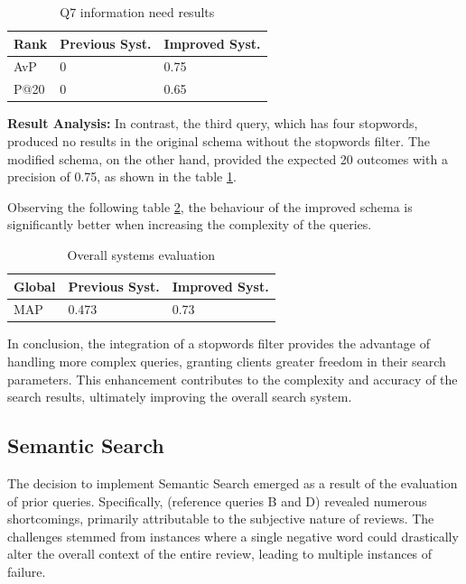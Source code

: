\documentclass[sigconf]{acmart}
\begin{document}
\begin{table}[H]
\caption{Q7 information need results}
\label{tab:q7}
\begin{tabular}{lll}
\toprule
Rank & Previous Syst. & Improved Syst.\\
\midrule
AvP & 0 & 0.75  \\
P@20 & 0 & 0.65 \\
\bottomrule
\end{tabular}
\end{table}

\textbf{Result Analysis:} In contrast, the third query, which has four stopwords, produced no results in the original schema without the stopwords filter. The modified schema, on the other hand, provided the expected 20 outcomes with a precision of 0.75, as shown in the table \ref{tab:q7}.

Observing the following table \ref{tab:map_stopwords}, the behaviour of the improved schema is significantly better when increasing the complexity of the queries.

\begin{table}[H]
\caption{Overall systems evaluation}
\label{tab:map_stopwords}
\begin{tabular}{lll}
\toprule
Global & Previous Syst. & Improved Syst.\\
\midrule
MAP & 0.473 & 0.73  \\

\bottomrule
\end{tabular}
\end{table}

In conclusion, the integration of a stopwords filter provides the advantage of handling more complex queries, granting clients greater freedom in their search parameters. This enhancement contributes to the complexity and accuracy of the search results, ultimately improving the overall search system.


\renewcommand{\thesubsection}{\arabic{section}.2}
\subsection{Semantic Search}

The decision to implement Semantic Search emerged as a result of the evaluation of prior queries. Specifically, (reference queries B and D) revealed numerous shortcomings, primarily attributable to the subjective nature of reviews. The challenges stemmed from instances where a single negative word could drastically alter the overall context of the entire review, leading to multiple instances of failure.
\end{document}
